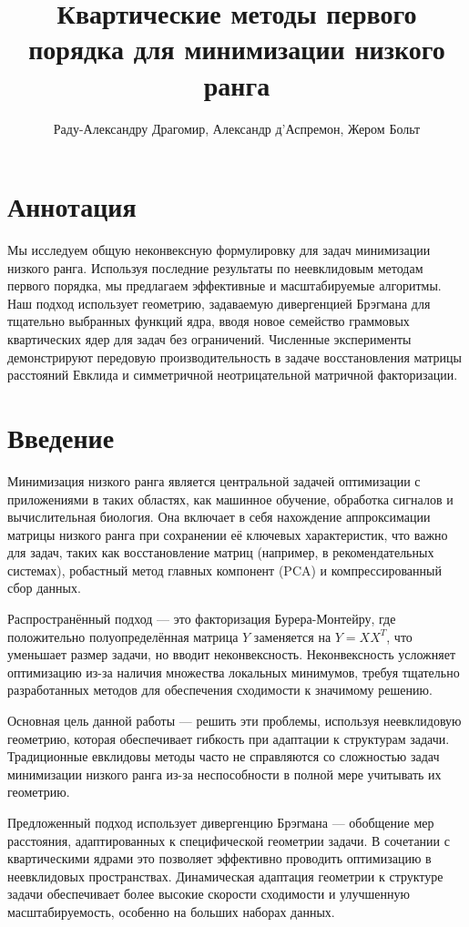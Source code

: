 \documentclass[a4paper,11pt]{article}
\title{Квартические методы первого порядка для минимизации низкого ранга}
\author{Раду-Александру Драгомир, Александр д'Аспремон, Жером Больт}
\date{}
\begin{document}
\maketitle
\tableofcontents
\newpage


\section*{Аннотация}
Мы исследуем общую неконвексную формулировку для задач минимизации низкого ранга. Используя последние результаты по неевклидовым методам первого порядка, мы предлагаем эффективные и масштабируемые алгоритмы. Наш подход использует геометрию, задаваемую дивергенцией Брэгмана для тщательно выбранных функций ядра, вводя новое семейство граммовых квартических ядер для задач без ограничений. Численные эксперименты демонстрируют передовую производительность в задаче восстановления матрицы расстояний Евклида и симметричной неотрицательной матричной факторизации.

\section{Введение}
Минимизация низкого ранга является центральной задачей оптимизации с приложениями в таких областях, как машинное обучение, обработка сигналов и вычислительная биология. Она включает в себя нахождение аппроксимации матрицы низкого ранга при сохранении её ключевых характеристик, что важно для задач, таких как восстановление матриц (например, в рекомендательных системах), робастный метод главных компонент (PCA) и компрессированный сбор данных.

Распространённый подход — это факторизация Бурера-Монтейру, где положительно полуопределённая матрица \( Y \) заменяется на \( Y = XX^T \), что уменьшает размер задачи, но вводит неконвексность. Неконвексность усложняет оптимизацию из-за наличия множества локальных минимумов, требуя тщательно разработанных методов для обеспечения сходимости к значимому решению.

Основная цель данной работы — решить эти проблемы, используя неевклидовую геометрию, которая обеспечивает гибкость при адаптации к структурам задачи. Традиционные евклидовы методы часто не справляются со сложностью задач минимизации низкого ранга из-за неспособности в полной мере учитывать их геометрию.

Предложенный подход использует дивергенцию Брэгмана — обобщение мер расстояния, адаптированных к специфической геометрии задачи. В сочетании с квартическими ядрами это позволяет эффективно проводить оптимизацию в неевклидовых пространствах. Динамическая адаптация геометрии к структуре задачи обеспечивает более высокие скорости сходимости и улучшенную масштабируемость, особенно на больших наборах данных.
\end{document}
